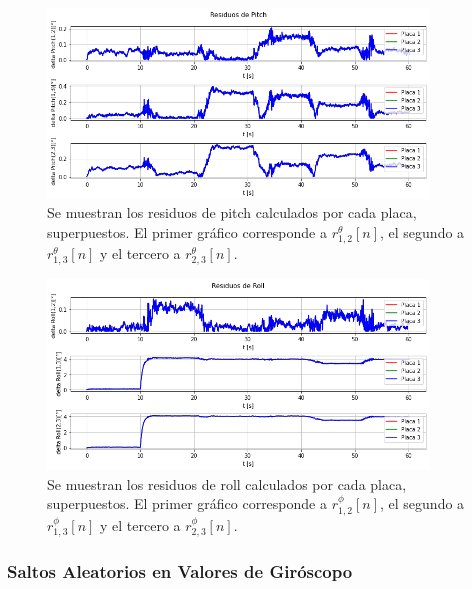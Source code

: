 \begin{figure}[H]
    \centering
    \includegraphics[width=0.9\textwidth]{img/resultados_residuos_pitch_bias_giroscopo.png}
    \caption{Se muestran los residuos de pitch calculados por cada placa, superpuestos. El primer gráfico corresponde a $r_{1,2}^{\theta}[n]$, el segundo a $r_{1,3}^{\theta}[n]$ y el tercero a $r_{2,3}^{\theta}[n]$.}
    \label{fig:resultados_residuos_pitch_bias_giroscopo}
\end{figure}

\begin{figure}[H]
    \centering
    \includegraphics[width=0.9\textwidth]{img/resultados_residuos_roll_bias_giroscopo.png}
    \caption{Se muestran los residuos de roll calculados por cada placa, superpuestos. El primer gráfico corresponde a $r_{1,2}^{\phi}[n]$, el segundo a $r_{1,3}^{\phi}[n]$ y el tercero a $r_{2,3}^{\phi}[n]$.}
    \label{fig:resultados_residuos_roll_bias_giroscopo}
\end{figure}


\subsubsection{Saltos Aleatorios en Valores de Giróscopo}

